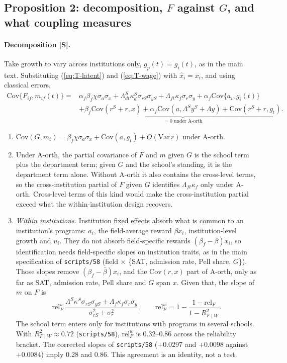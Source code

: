 \subsection{Proposition 2: decomposition, $F$ against $G$, and what coupling measures}\label{si:theory:decomp}

\paragraph{Decomposition [S].} Take growth to vary across institutions only, $g_p(t)=g_i(t)$, as in the main
text. Substituting (\ref{eq:T-latent}) and (\ref{eq:T-wage}) with $\hat x_i=x_i$, and using classical errors,
\begin{align}
\mathrm{Cov}\{F_{if},m_{if}(t)\}={}&\alpha_f\beta_f\chi\sigma_a\sigma_x+\Lambda^S_{dt}\kappa^S_d\sigma_{rS}\sigma_{yS}
+\Lambda_{ft}\kappa_f\sigma_r\sigma_y+\alpha_f\mathrm{Cov}\{a_i,g_{i}(t)\}\label{eq:T-decomp}\\
&+\underbrace{\beta_f\mathrm{Cov}(r^S+r,x)+\alpha_f\mathrm{Cov}(a,\Lambda^S y^S+\Lambda y)+\mathrm{Cov}(r^S+r,g_t)}_{=0\text{ under A-orth}} .\nonumber
\end{align}
\begin{enumerate}
\item[(i)] $\mathrm{Cov}(G,m_t)=\beta_f\chi\sigma_a\sigma_x+\mathrm{Cov}(a,g_t)+O(\mathrm{Var}\,\bar r)$ under A-orth.
\item[(ii)] Under A-orth, the partial covariance of $F$ and $m$ given $G$ is the school term plus the department
term; given $G$ and the school's standing, it is the department term alone. Without A-orth it also contains the
cross-level terms, so the cross-institution partial of $F$ given $G$ identifies $\Lambda_{ft}\kappa_f$ only under
A-orth. Cross-level terms of this kind would make the cross-institution partial exceed what the
within-institution design recovers.
\item[(iii)] \emph{Within institutions.} Institution fixed effects absorb what is common to an institution's
programs: $a_i$, the field-average reward $\bar\beta x_i$, institution-level growth and $u_i$. They do not absorb
field-specific rewards $(\beta_f-\bar\beta)x_i$, so identification needs field-specific slopes on institution
traits, as in the main specification of \texttt{scripts/58} (field $\times$ \{SAT, admission rate, Pell share,
$G$\}). Those slopes remove $(\beta_f-\bar\beta)x_i$, and the $\mathrm{Cov}(r,x)$ part of A-orth, only as far as
SAT, admission rate, Pell share and $G$ span $x$. Given that, the slope of $m$ on $F$ is
\[
\mathrm{rel}^w_F\,\frac{\Lambda^S\kappa^S\sigma_{rS}\sigma_{yS}+\Lambda_{f}\kappa_f\sigma_r\sigma_y}{\sigma_{rS}^2+\sigma_r^2},
\qquad \mathrm{rel}^w_F=1-\frac{1-\mathrm{rel}_F}{1-R^2_{F\mid W}} .
\]
The school term enters only for institutions with programs in several schools. With $R^2_{F\mid W}\approx0.72$
(\texttt{scripts/58}), $\mathrm{rel}^w_F$ is 0.32--0.86 across the reliability bracket. The corrected slopes of
\texttt{scripts/58} ($+0.0297$ and $+0.0098$ against $+0.0084$) imply 0.28 and 0.86. This agreement is an
identity, not a test.
\end{enumerate}

